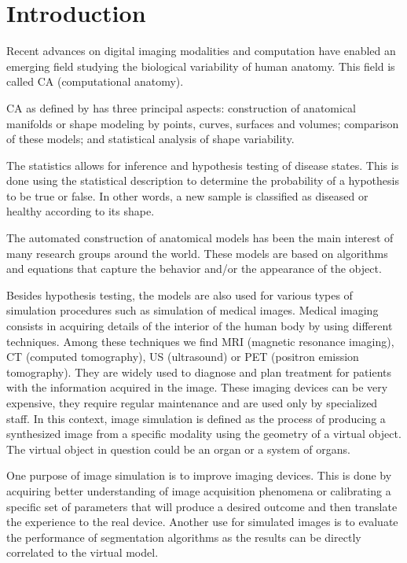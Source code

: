 
\graphicspath{{Introduction/images/}}

\chapter{Introduction}
\label{chapter:Introduction}

Recent advances on digital imaging modalities
and computation have enabled an emerging field 
studying the biological variability of human anatomy. 
This field is called CA (computational anatomy).

CA as defined by \cite{Grenander1998} has three principal aspects: construction of
anatomical manifolds or shape modeling by points, curves, surfaces and volumes;
comparison of these models; and statistical analysis of shape variability.

The statistics allows for inference and hypothesis testing of disease states.
This is done using the statistical description
to determine the probability of a hypothesis to be true or false.
In other words, a new sample is classified as diseased or healthy 
according to its shape.

The automated construction of anatomical models 
has been the main interest of many research groups around the world. 
These models are based on algorithms and equations that capture the behavior
and/or the appearance of the object.

Besides hypothesis testing, the models are also used for 
various types of simulation procedures such as simulation of medical images.
Medical imaging consists in acquiring details of the interior of the human body by using different techniques. 
Among these techniques we find MRI (magnetic resonance imaging), CT (computed tomography),
US (ultrasound) or PET (positron emission tomography). 
They are widely used to diagnose and plan treatment for patients with the information acquired in the image.
These imaging devices can be very expensive, they require regular maintenance and are used only by specialized staff. 
In this context, image simulation is defined as the process of producing a synthesized image 
from a specific modality using the geometry of a virtual object. 
The virtual object in question could be an organ or a system of organs.

One purpose of image simulation is to improve imaging devices.
This is done by acquiring better understanding of image acquisition phenomena
or calibrating a specific set of parameters that will produce a desired outcome 
and then translate the experience to the real device.
Another use for simulated images is to evaluate the performance of segmentation algorithms as 
the results can be directly correlated to the virtual model.

